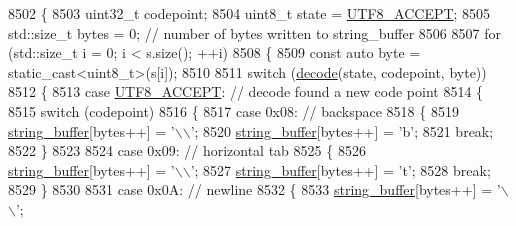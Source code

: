 \begin{DoxyCode}
8502     \{
8503         uint32\_t codepoint;
8504         uint8\_t state = \hyperlink{classnlohmann_1_1detail_1_1serializer_a52898111c3bbd130b2481dbef93c7292}{UTF8\_ACCEPT};
8505         std::size\_t bytes = 0;  \textcolor{comment}{// number of bytes written to string\_buffer}
8506 
8507         \textcolor{keywordflow}{for} (std::size\_t i = 0; i < s.size(); ++i)
8508         \{
8509             \textcolor{keyword}{const} \textcolor{keyword}{auto} byte = \textcolor{keyword}{static\_cast<}uint8\_t\textcolor{keyword}{>}(s[i]);
8510 
8511             \textcolor{keywordflow}{switch} (\hyperlink{classnlohmann_1_1detail_1_1serializer_a1cc5cb2f6993cefedad087a6cef0e8fb}{decode}(state, codepoint, byte))
8512             \{
8513                 \textcolor{keywordflow}{case} \hyperlink{classnlohmann_1_1detail_1_1serializer_a52898111c3bbd130b2481dbef93c7292}{UTF8\_ACCEPT}:  \textcolor{comment}{// decode found a new code point}
8514                 \{
8515                     \textcolor{keywordflow}{switch} (codepoint)
8516                     \{
8517                         \textcolor{keywordflow}{case} 0x08: \textcolor{comment}{// backspace}
8518                         \{
8519                             \hyperlink{classnlohmann_1_1detail_1_1serializer_a9c9b7ca63a66e59e5e7ffe8a2acf5c8f}{string\_buffer}[bytes++] = \textcolor{charliteral}{'\(\backslash\)\(\backslash\)'};
8520                             \hyperlink{classnlohmann_1_1detail_1_1serializer_a9c9b7ca63a66e59e5e7ffe8a2acf5c8f}{string\_buffer}[bytes++] = \textcolor{charliteral}{'b'};
8521                             \textcolor{keywordflow}{break};
8522                         \}
8523 
8524                         \textcolor{keywordflow}{case} 0x09: \textcolor{comment}{// horizontal tab}
8525                         \{
8526                             \hyperlink{classnlohmann_1_1detail_1_1serializer_a9c9b7ca63a66e59e5e7ffe8a2acf5c8f}{string\_buffer}[bytes++] = \textcolor{charliteral}{'\(\backslash\)\(\backslash\)'};
8527                             \hyperlink{classnlohmann_1_1detail_1_1serializer_a9c9b7ca63a66e59e5e7ffe8a2acf5c8f}{string\_buffer}[bytes++] = \textcolor{charliteral}{'t'};
8528                             \textcolor{keywordflow}{break};
8529                         \}
8530 
8531                         \textcolor{keywordflow}{case} 0x0A: \textcolor{comment}{// newline}
8532                         \{
8533                             \hyperlink{classnlohmann_1_1detail_1_1serializer_a9c9b7ca63a66e59e5e7ffe8a2acf5c8f}{string\_buffer}[bytes++] = \textcolor{charliteral}{'\(\backslash\)\(\backslash\)'};

\end{DoxyCode}
